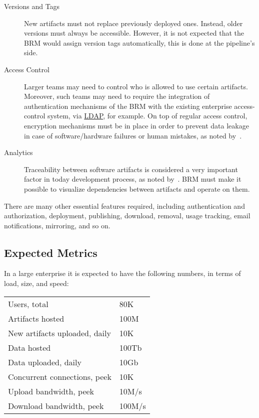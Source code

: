 \documentclass[12pt,oneside]{article}
\begin{document}
\begin{description}
  \item[Versions and Tags]
  New artifacts must not replace previously deployed ones.
  Instead, older versions must always be accessible. However,
  it is not expected that the BRM would assign version tags automatically,
  this is done at the pipeline's side.

  \item[Access Control]
  Larger teams may need to control who is allowed to use certain artifacts.
  Moreover, such teams may need to require the integration of authentication
  mechanisms of the BRM with the existing enterprise access-control system,
  via \href{https://en.wikipedia.org/wiki/Lightweight_Directory_Access_Protocol}{LDAP},
  for example. On top of regular access control, encryption mechanisms must
  be in place in order to prevent data leakage in case of software/hardware
  failures or human mistakes, as noted by~\textcite{paule2018}.

  \item[Analytics]
  Traceability between software artifacts is considered a very
  important factor in today development process, as noted by~\textcite{palihawadana2017}.
  BRM must make it possible to visualize dependencies between artifacts and
  operate on them.
\end{description}

There are many other essential features required, including
authentication and authorization, deployment, publishing,
download, removal, usage tracking, email notifications, mirroring,
and so on.

\subsection{Expected Metrics}
\label{ref:metrics}

In a large enterprise it is expected to have the following
numbers, in terms of load, size, and speed:

\begin{tabular}{ll}
Users, total & 80K \\
Artifacts hosted & 100M \\
New artifacts uploaded, daily & 10K \\
Data hosted & 100Tb \\
Data uploaded, daily & 10Gb \\
Concurrent connections, peek & 10K \\
Upload bandwidth, peek & 10M/s \\
Download bandwidth, peek & 100M/s \\
\end{tabular}
\end{document}
